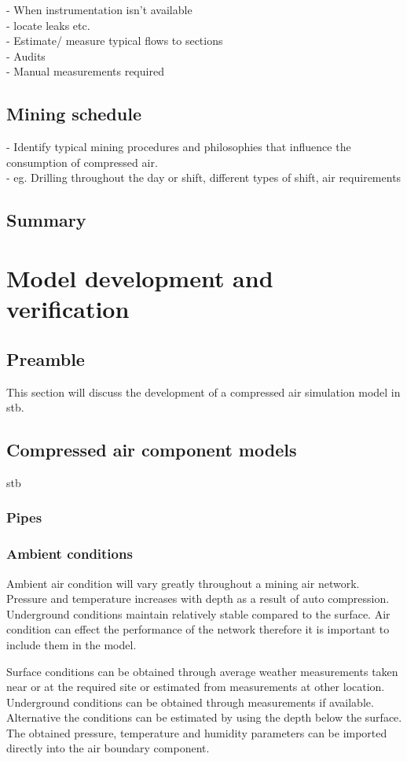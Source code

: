 		- When instrumentation isn't available\\
		- locate leaks etc.\\
		- Estimate/ measure typical flows to sections\\
		- Audits\\
		- Manual measurements required
	\subsection{Mining schedule}
		- Identify typical mining procedures and philosophies that influence the consumption of compressed air.\\
		- eg. Drilling throughout the day or shift, different types of shift, air requirements
	\subsection{Summary}
\section{Model development and verification}
	\subsection{Preamble}
	This section will discuss the development of a compressed air simulation model in \gls{stb}.
	\subsection{Compressed air component models}
		\gls{stb} 
		\subsubsection{Pipes}
		\subsubsection{Ambient conditions}
		Ambient air condition will vary greatly throughout a mining air network. Pressure and temperature increases with depth  as a result of auto compression. Underground conditions maintain relatively stable compared to the surface. Air condition can effect the performance of the network therefore it is important to include them in the model.
		\par 
		Surface conditions can be obtained through average weather measurements taken near or at the required site or estimated from measurements at other location. Underground conditions can be obtained through measurements if available. Alternative the conditions can be estimated by using the depth below the surface. The obtained pressure, temperature and humidity parameters can be imported directly into the air boundary component.
